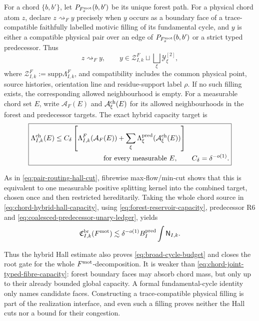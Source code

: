 \documentclass[11pt]{article}
\newcommand{\supp}{\mathrm{supp}}
\begin{document}
For a chord \(\{b,b'\}\), let \(P_{F_x^{\rm mot}}(b,b')\) be its unique
forest path.
For a physical chord atom \(z\), declare \(z\rightsquigarrow_F y\) precisely
when \(y\) occurs as a boundary face of a trace-compatible faithfully labelled
motivic filling of its fundamental cycle, and \(y\) is either a compatible
physical pair over an edge of \(P_{F_x^{\rm mot}}(b,b')\) or a strict typed
predecessor.
Thus
\[
 z\rightsquigarrow_F y,
 \qquad
 y\in
 \mathscr Z_{I,k}^{F}
 \sqcup\bigsqcup_\xi\mathscr Y_\xi^{[2]},
\]
where \(\mathscr Z_{I,k}^{F}:=\supp\Lambda_{I,k}^{F}\), and compatibility
includes the common physical point, source histories, orientation line and
residue-support label \(\rho\).  If no such filling exists, the corresponding
allowed neighbourhood is empty.  For a measurable chord set \(E\), write
\(\mathcal A_F(E)\) and \(\mathcal A_\xi^{\rm ch}(E)\) for its allowed
neighbourhoods in the forest and predecessor targets.  The exact hybrid
capacity target is
\begin{equation}\label{eq:chord-hybrid-hall-capacity}
 \boxed{\begin{aligned}
 \Lambda_{I,k}^{\rm ch}(E)
 &\le C_\delta\left[
       \Lambda_{I,k}^{F}(\mathcal A_F(E))
       +\sum_\xi
        \Lambda_\xi^{\rm pred}(\mathcal A_\xi^{\rm ch}(E))
      \right]\\
 &\hspace{7em}\text{for every measurable }E,
 \qquad C_\delta=\delta^{-o(1)}.
 \end{aligned}}
\end{equation}

As in \eqref{eq:pair-routing-hall-cut}, fibrewise max-flow/min-cut shows that
this is equivalent to one measurable positive splitting kernel into the
combined target, chosen once and then restricted hereditarily.  Taking the
whole chord source in \eqref{eq:chord-hybrid-hall-capacity}, using
\eqref{eq:forest-reservoir-capacity}, predecessor R6 and
\eqref{eq:coalesced-predecessor-unary-ledger}, yields
\[
 \mathfrak C_{I,k}^{\rm br}(F^{\rm mot})
 \lesssim
 \delta^{-o(1)}B_I^{\rm pred}\int\mathsf N_{I,k}.
\]

Thus the hybrid Hall estimate also proves
\eqref{eq:broad-cycle-budget} and closes the root gate for the whole
\(F^{\rm mot}\)-decomposition.  It is weaker than
\eqref{eq:chord-joint-typed-fibre-capacity}: forest boundary faces may absorb
chord mass, but only up to their already bounded global capacity.  A formal
fundamental-cycle identity only names candidate faces.  Constructing a
trace-compatible physical filling is part of the realization interface, and
even such a filling proves neither the Hall cuts nor a bound for their
congestion.
\end{document}
